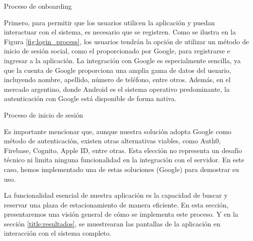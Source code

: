 \begin{images}[\label{onboarding_process}]{Proceso de onboarding}
\end{images}

Primero, para permitir que los usuarios utilicen la aplicación y puedan interactuar con el sistema, es necesario que se registren. Como se ilustra en la Figura \ref{fig:login_process}, los usuarios tendrán la opción de utilizar un método de inicio de sesión social, como el proporcionado por Google, para registrarse e ingresar a la aplicación. La integración con Google es especialmente sencilla, ya que la cuenta de Google proporciona una amplia gama de datos del usuario, incluyendo nombre, apellido, número de teléfono, entre otros. Además, en el mercado argentino, donde Android es el sistema operativo predominante, la autenticación con Google está disponible de forma nativa.

\begin{images}[\label{fig:login_process}]{Proceso de inicio de sesión}
\end{images}

Es importante mencionar que, aunque nuestra solución adopta Google como método de autenticación, existen otras alternativas viables, como Auth0, Firebase, Cognito, Apple ID, entre otras. Esta elección no representa un desafío técnico ni limita ninguna funcionalidad en la integración con el servidor. En este caso, hemos implementado una de estas soluciones (Google) para demostrar su uso.

La funcionalidad esencial de nuestra aplicación es la capacidad de buscar y reservar una plaza de estacionamiento de manera eficiente. En esta sección, presentaremos una visión general de cómo se implementa este proceso. Y en la sección \ref{title:resultados}, se muestrearan las pantallas de la aplicación en interacción con el sistema completo.

